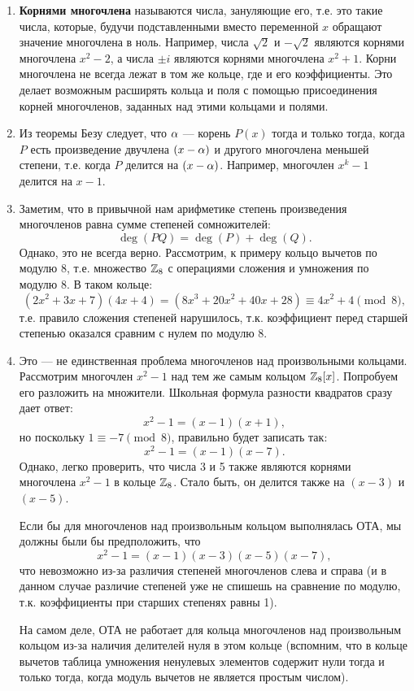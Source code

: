 \begin{enumerate}
\item \textbf{Корнями многочлена} называются числа, зануляющие его, т.е. это такие числа, которые, будучи подставленными вместо переменной $x$ обращают значение многочлена в ноль. Например, числа $\sqrt 2$ и $-\sqrt 2$ являются корнями многочлена $x^2-2$, а числа $\pm i$ являются корнями многочлена $x^2+1$. Корни многочлена не всегда лежат в том же кольце, где и его коэффициенты. Это делает возможным расширять кольца и поля с помощью присоединения корней многочленов, заданных над этими кольцами и полями.
\item Из теоремы Безу следует, что $\alpha$ --- корень $P(x)$ тогда и только тогда, когда $P$ есть произведение двучлена $(x-\alpha)$ и другого многочлена меньшей степени, т.е. когда $P$ делится на $(x-\alpha)$. Например, многочлен $x^k-1$ делится на $x-1$.

\item Заметим, что в привычной нам арифметике степень произведения многочленов равна сумме степеней сомножителей:
$$
\deg(PQ)=\deg(P)+\deg(Q).
$$
Однако, это не всегда верно. Рассмотрим, к примеру кольцо вычетов по модулю $8$, т.е. множество $\mathbb Z_8$ с операциями сложения и умножения по модулю $8$. В таком кольце:
$$
(2x^2+3x+7)(4x+4) = (8x^3+20x^2+40x+28) \equiv 4x^2+4\pmod 8,
$$
т.е. правило сложения степеней нарушилось, т.к. коэффициент перед старшей степенью оказался сравним с нулем по модулю $8$.
\item Это --- не единственная проблема многочленов над произвольными кольцами. Рассмотрим многочлен $x^2-1$ над тем же самым кольцом $\mathbb Z_8[x]$.
Попробуем его разложить на множители. Школьная формула разности квадратов сразу дает ответ:
$$
x^2-1=(x-1)(x+1),
$$
но поскольку $1\equiv -7\pmod 8$, правильно будет записать так:
$$
x^2-1=(x-1)(x-7).
$$
Однако, легко проверить, что числа 3 и 5 также являются корнями многочлена $x^2-1$ в кольце $\mathbb Z_8$. Стало быть, он делится также на $(x-3)$ и $(x-5)$.

Если бы для многочленов над произвольным кольцом выполнялась ОТА, мы должны были бы предположить, что
$$
x^2-1=(x-1)(x-3)(x-5)(x-7),
$$
что невозможно из-за различия степеней многочленов слева и справа (и в данном случае различие степеней уже не спишешь на сравнение по модулю, т.к. коэффициенты при старших степенях равны 1).

На самом деле, ОТА не работает для кольца многочленов над произвольным кольцом из-за наличия делителей нуля в этом кольце (вспомним, что в кольце вычетов таблица умножения ненулевых элементов содержит нули тогда и только тогда, когда модуль вычетов не является простым числом).


\end{enumerate}
